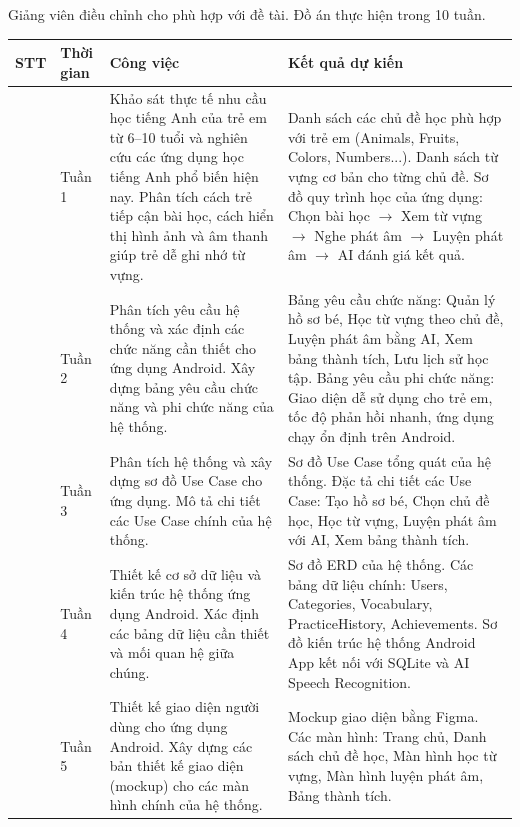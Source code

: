 \documentclass[../main.tex]{subfiles}
\begin{document}
	Giảng viên điều chỉnh cho phù hợp với đề tài. Đồ án thực hiện trong 10 tuần.
	
	\begin{center}
		\small
		\renewcommand{\arraystretch}{1.22}
		\setlength{\tabcolsep}{4pt}
		\begin{longtable}{|>{\centering\arraybackslash}p{0.8cm}|
				>{\centering\arraybackslash}p{1.45cm}|
				>{\raggedright\arraybackslash}p{6.1cm}|
				>{\raggedright\arraybackslash}p{6.1cm}|}
			\hline
			\textbf{STT} & \textbf{Thời gian} & \centering\textbf{Công việc} & \centering\textbf{Kết quả dự kiến}\tabularnewline
			\hline
			1 & Tuần 1 & Khảo sát thực tế nhu cầu học tiếng Anh của trẻ em từ 6--10 tuổi và nghiên cứu các ứng dụng học tiếng Anh phổ biến hiện nay. Phân tích cách trẻ tiếp cận bài học, cách hiển thị hình ảnh và âm thanh giúp trẻ dễ ghi nhớ từ vựng. & Danh sách các chủ đề học phù hợp với trẻ em (Animals, Fruits, Colors, Numbers...). Danh sách từ vựng cơ bản cho từng chủ đề. Sơ đồ quy trình học của ứng dụng: Chọn bài học $\rightarrow$ Xem từ vựng $\rightarrow$ Nghe phát âm $\rightarrow$ Luyện phát âm $\rightarrow$ AI đánh giá kết quả.\\ \hline
			2 & Tuần 2 & Phân tích yêu cầu hệ thống và xác định các chức năng cần thiết cho ứng dụng Android. Xây dựng bảng yêu cầu chức năng và phi chức năng của hệ thống. & Bảng yêu cầu chức năng: Quản lý hồ sơ bé, Học từ vựng theo chủ đề, Luyện phát âm bằng AI, Xem bảng thành tích, Lưu lịch sử học tập. Bảng yêu cầu phi chức năng: Giao diện dễ sử dụng cho trẻ em, tốc độ phản hồi nhanh, ứng dụng chạy ổn định trên Android.\\ \hline
			3 & Tuần 3 & Phân tích hệ thống và xây dựng sơ đồ Use Case cho ứng dụng. Mô tả chi tiết các Use Case chính của hệ thống. & Sơ đồ Use Case tổng quát của hệ thống. Đặc tả chi tiết các Use Case: Tạo hồ sơ bé, Chọn chủ đề học, Học từ vựng, Luyện phát âm với AI, Xem bảng thành tích.\\ \hline
			4 & Tuần 4 & Thiết kế cơ sở dữ liệu và kiến trúc hệ thống ứng dụng Android. Xác định các bảng dữ liệu cần thiết và mối quan hệ giữa chúng. & Sơ đồ ERD của hệ thống. Các bảng dữ liệu chính: Users, Categories, Vocabulary, PracticeHistory, Achievements. Sơ đồ kiến trúc hệ thống Android App kết nối với SQLite và AI Speech Recognition.\\ \hline
			5 & Tuần 5 & Thiết kế giao diện người dùng cho ứng dụng Android. Xây dựng các bản thiết kế giao diện (mockup) cho các màn hình chính của hệ thống. & Mockup giao diện bằng Figma. Các màn hình: Trang chủ, Danh sách chủ đề học, Màn hình học từ vựng, Màn hình luyện phát âm, Bảng thành tích.\\ \hline

\end{longtable}
\end{center}
\end{document}
